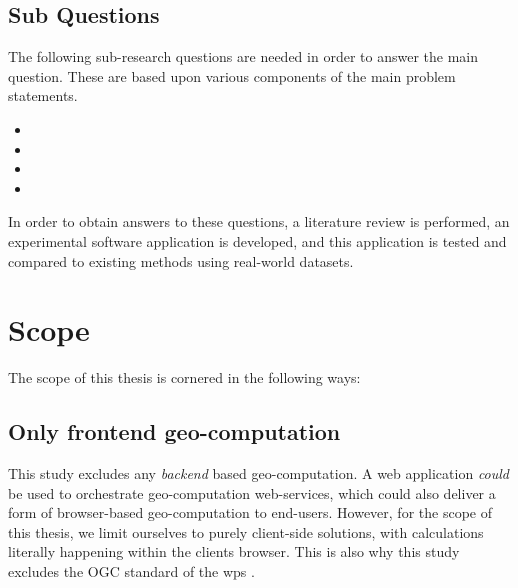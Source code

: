 \subsection*{Sub Questions}
The following sub-research questions are needed in order to answer the main question.
These are based upon various components of the main problem statements. 
\begin{itemize}[-]
  \item \mySubRQOne
  \item \mySubRQTwo
  \item \mySubRQThree
  \item \mySubRQFour
\end{itemize}
In order to obtain answers to these questions, a literature review is performed,
an experimental software application is developed, 
and this application is tested and compared to existing methods using real-world datasets.




\newpage
\section{Scope}
The scope of this thesis is cornered in the following ways: 

\subsection*{Only frontend geo-computation}
This study excludes any \emph {backend} based geo-computation.
A web application \textit{could} be used to orchestrate geo-computation web-services, which could also deliver a form of browser-based geo-computation to end-users. 
However, for the scope of this thesis, we limit ourselves to purely client-side solutions, with calculations literally happening within the clients browser. 
This is also why this study excludes the OGC standard of the \ac{wps} \cite{ogc_web_2015}.

